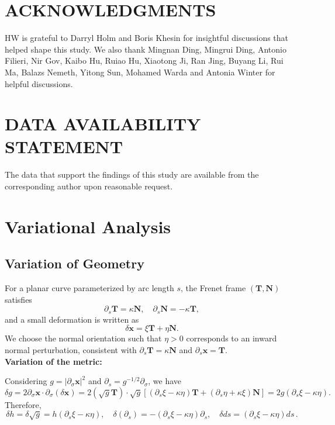 \documentclass[
aip,
jcp,
reprint, 
floatfix
]{revtex4-1}
\begin{document}
\section{ACKNOWLEDGMENTS}
HW is grateful to Darryl Holm and Boris Khesin for insightful discussions that helped shape this study. We also thank Mingnan Ding, Mingrui Ding, Antonio Filieri, Nir Gov, Kaibo Hu, Ruiao Hu, Xiaotong Ji, Ran Jing, Buyang Li, Rui Ma, Balazs Nemeth, Yitong Sun, Mohamed Warda and Antonia Winter for helpful discussions. 


\section*{DATA AVAILABILITY STATEMENT}
The data that support the findings of this study are available from the corresponding author upon reasonable request. 





\onecolumngrid  

\newpage

\appendix
\newpage

\section{Variational Analysis}\label{secapp: variation}
\subsection{Variation of Geometry}
For a planar curve parameterized by arc length $s$, the Frenet frame $(\mathbf{T}, \mathbf{N})$ satisfies
\begin{equation}
\partial_s \mathbf{T}=\kappa \mathbf{N}, \quad \partial_s \mathbf{N}=-\kappa \mathbf{T},
\end{equation}
and a small deformation is written as
\begin{equation}
\delta \mathbf{x}=\xi \mathbf{T}+\eta \mathbf{N} .
\end{equation}
We choose the normal orientation such that $\eta>0$ corresponds to an inward normal perturbation, consistent with $\partial_s \mathbf{T}=\kappa \mathbf{N}$ and $\partial_s \mathbf{x} = \mathbf{T}$.\\

{\bf Variation of the metric:}

Considering $g=\left|\partial_\sigma \mathbf{x}\right|^2$ and  $\partial_s=g^{-1 / 2} \partial_\sigma$,  we have
\begin{equation}
\delta g
=2 \partial_\sigma \mathbf{x} \cdot \partial_\sigma(\delta \mathbf{x})
=2(\sqrt{g} \mathbf{T}) \cdot \sqrt{g}\left[\left(\partial_s \xi-\kappa \eta\right) \mathbf{T}+\left(\partial_s \eta+\kappa \xi\right) \mathbf{N}\right] 
=2 g\left(\partial_s \xi-\kappa \eta\right).
\end{equation}
Therefore, 
\begin{equation}
 \delta h = \delta \sqrt{g}=h\left(\partial_s \xi-\kappa \eta\right),\quad \delta\left(\partial_s\right)=-\left(\partial_s \xi-\kappa \eta\right) \partial_s, \quad
 \delta d s=\left(\partial_s \xi-\kappa \eta\right) d s\,.
\end{equation}
\end{document}
